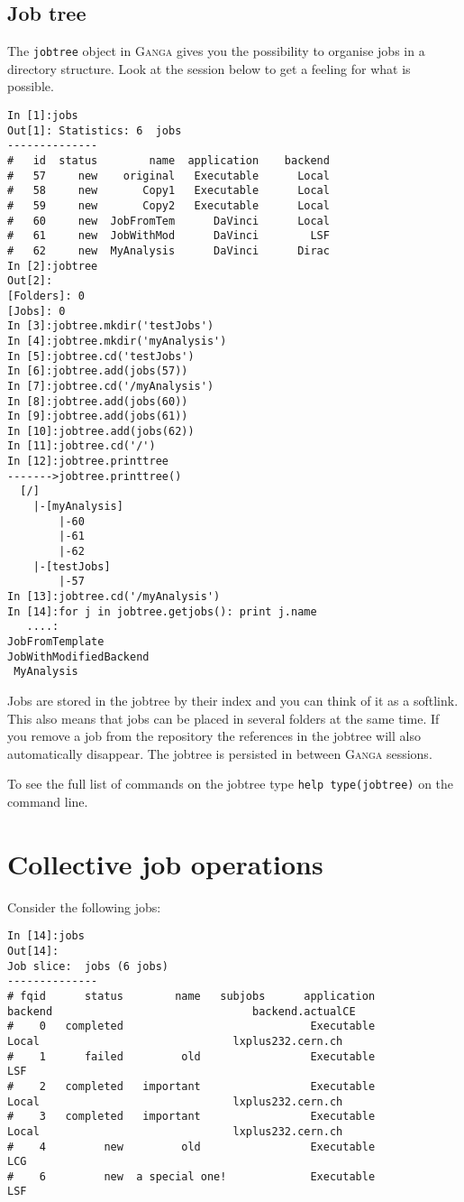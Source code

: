 \documentclass{howto}
\def\ganga {\textsc{Ganga}\xspace}
\begin{document}
\subsection{Job tree}
\label{sec:jobtree}
The \texttt{jobtree} object in \ganga gives you the possibility to organise
jobs in a directory structure. Look at the session below to get a feeling for
what is possible.
\begin{verbatim}
In [1]:jobs
Out[1]: Statistics: 6  jobs
--------------
#   id  status        name  application    backend
#   57     new    original   Executable      Local
#   58     new       Copy1   Executable      Local
#   59     new       Copy2   Executable      Local
#   60     new  JobFromTem      DaVinci      Local
#   61     new  JobWithMod      DaVinci        LSF
#   62     new  MyAnalysis      DaVinci      Dirac
In [2]:jobtree
Out[2]: 
[Folders]: 0
[Jobs]: 0
In [3]:jobtree.mkdir('testJobs')
In [4]:jobtree.mkdir('myAnalysis')
In [5]:jobtree.cd('testJobs')
In [6]:jobtree.add(jobs(57))
In [7]:jobtree.cd('/myAnalysis')
In [8]:jobtree.add(jobs(60))
In [9]:jobtree.add(jobs(61))
In [10]:jobtree.add(jobs(62))
In [11]:jobtree.cd('/')
In [12]:jobtree.printtree
------->jobtree.printtree()
  [/]
    |-[myAnalysis]
        |-60
        |-61
        |-62
    |-[testJobs]
        |-57
In [13]:jobtree.cd('/myAnalysis')
In [14]:for j in jobtree.getjobs(): print j.name
   ....: 
JobFromTemplate
JobWithModifiedBackend
 MyAnalysis
\end{verbatim}

Jobs are stored in the jobtree by their index and you can think of it as a
softlink. This also means that jobs can be placed in several folders at the
same time. If you remove a job from the repository the references in the
jobtree will also automatically disappear. The jobtree is persisted in
between \ganga sessions.

To see the full list of commands on the jobtree type \texttt{help
  type(jobtree)} on the command line.
 




\section{Collective job operations}
\label{sec:collective}

Consider the following jobs:

\begin{verbatim}
In [14]:jobs
Out[14]:
Job slice:  jobs (6 jobs)
--------------
# fqid      status        name   subjobs      application          backend                               backend.actualCE
#    0   completed                             Executable            Local                              lxplus232.cern.ch
#    1      failed         old                 Executable              LSF
#    2   completed   important                 Executable            Local                              lxplus232.cern.ch
#    3   completed   important                 Executable            Local                              lxplus232.cern.ch
#    4         new         old                 Executable              LCG
#    6         new  a special one!             Executable              LSF
\end{verbatim}
\end{document}
